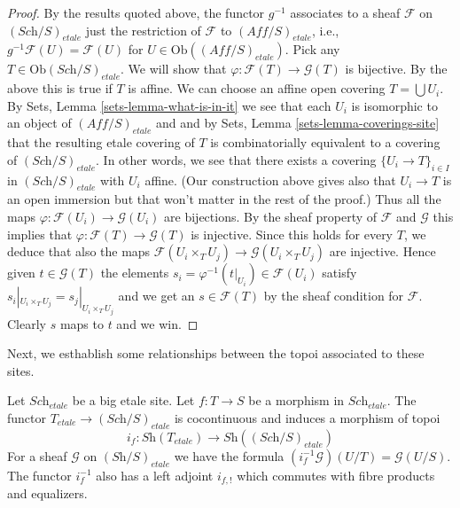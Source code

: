 \begin{proof}
\medskip\noindent
By the results quoted above,
the functor $g^{-1}$ associates to a sheaf $\mathcal{F}$ on
$(\textit{Sch}/S)_{etale}$ just the restriction of $\mathcal{F}$
to $(\textit{Aff}/S)_{etale}$, i.e., $g^{-1}\mathcal{F}(U) = \mathcal{F}(U)$
for $U \in \text{Ob}((\textit{Aff}/S)_{etale})$. Pick any
$T \in \text{Ob}(\textit{Sch}/S)_{etale}$. We will show that
$\varphi : \mathcal{F}(T) \to \mathcal{G}(T)$ is bijective.
By the above this is true if $T$ is affine.
We can choose an affine open covering $T = \bigcup U_i$. By
Sets, Lemma \ref{sets-lemma-what-is-in-it} we see that
each $U_i$ is isomorphic to an object of $(\textit{Aff}/S)_{etale}$
and and by Sets, Lemma \ref{sets-lemma-coverings-site}
that the resulting etale covering of $T$ is combinatorially
equivalent to a covering of $(\textit{Sch}/S)_{etale}$.
In other words, we see that there exists a covering
$\{U_i \to T\}_{i \in I}$ in $(\textit{Sch}/S)_{etale}$ with $U_i$ affine.
(Our construction above gives also that $U_i \to T$ is an open immersion
but that won't matter in the rest of the proof.)
Thus all the maps $\varphi : \mathcal{F}(U_i) \to \mathcal{G}(U_i)$
are bijections. By the sheaf property of $\mathcal{F}$ and $\mathcal{G}$
this implies that $\varphi : \mathcal{F}(T) \to \mathcal{G}(T)$ is injective.
Since this holds for every $T$, we deduce that also the maps
$\mathcal{F}(U_i \times_T U_j) \to \mathcal{G}(U_i \times_T U_j)$
are injective. Hence given $t \in \mathcal{G}(T)$
the elements $s_i = \varphi^{-1}(t|_{U_i}) \in \mathcal{F}(U_i)$
satisfy $s_i|_{U_i \times_T U_j} = s_j|_{U_i \times_T U_j}$
and we get an $s \in \mathcal{F}(T)$ by the sheaf condition
for $\mathcal{F}$. Clearly $s$ maps to $t$ and we win.
\end{proof}

\noindent
Next, we esthablish some relationships between the topoi
associated to these sites.

\begin{lemma}
\label{lemma-put-in-T-etale}
Let $\textit{Sch}_{etale}$ be a big etale site.
Let $f : T \to S$ be a morphism in $\textit{Sch}_{etale}$.
The functor $T_{etale} \to (\textit{Sch}/S)_{etale}$
is cocontinuous and induces a morphism of topoi
$$
i_f :
\textit{Sh}(T_{etale})
\longrightarrow
\textit{Sh}((\textit{Sch}/S)_{etale})
$$
For a sheaf $\mathcal{G}$ on $(\textit{Sh}/S)_{etale}$
we have the formula $(i_f^{-1}\mathcal{G})(U/T) = \mathcal{G}(U/S)$.
The functor $i_f^{-1}$ also has a left adjoint $i_{f, !}$ which commutes
with fibre products and equalizers.
\end{lemma}


